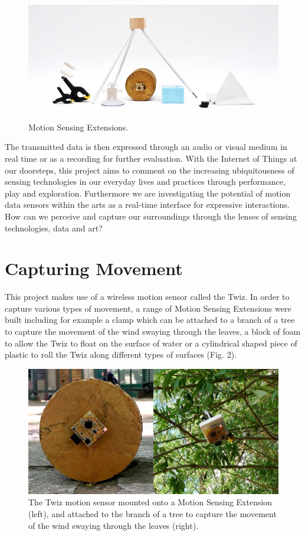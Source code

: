 \documentclass{sigchi}
\begin{document}
\begin{figure}[H]
\centering
\includegraphics[width=\columnwidth]{pics/extensions}
\caption{Motion Sensing Extensions.}
\label{fig:extensions}
\end{figure}

The transmitted data is
then expressed through an audio or visual medium in
real time or as a recording for further evaluation. With
the Internet of Things at our doorsteps, this project
aims to comment on the increasing ubiquitousness of
sensing technologies in our everyday lives and practices
through performance, play and exploration.
Furthermore we are investigating the potential of
motion data sensors within the arts as a real-time
interface for expressive interactions. How can we
perceive and capture our surroundings through the
lenses of sensing technologies, data and art?

\section{Capturing Movement}

This project makes use of a wireless motion sensor
called the Twiz\cite{twiz}. In order to capture various types of
movement, a range of Motion Sensing Extensions were
built including for example a clamp which can be
attached to a branch of a tree to capture the movement
of the wind swaying through the leaves, a block of
foam to allow the Twiz to float on the surface of water
or a cylindrical shaped piece of plastic to roll the Twiz
along different types of surfaces (Fig. 2).

\begin{figure}[H]
\centering
\includegraphics[width=\columnwidth]{pics/fieldtrip}
\caption{The Twiz motion sensor mounted onto a Motion
Sensing Extension (left), and attached to the branch of
a tree to capture the movement of the wind swaying through
the leaves (right).}
\label{fig:fieldtrip}
\end{figure}
\end{document}
